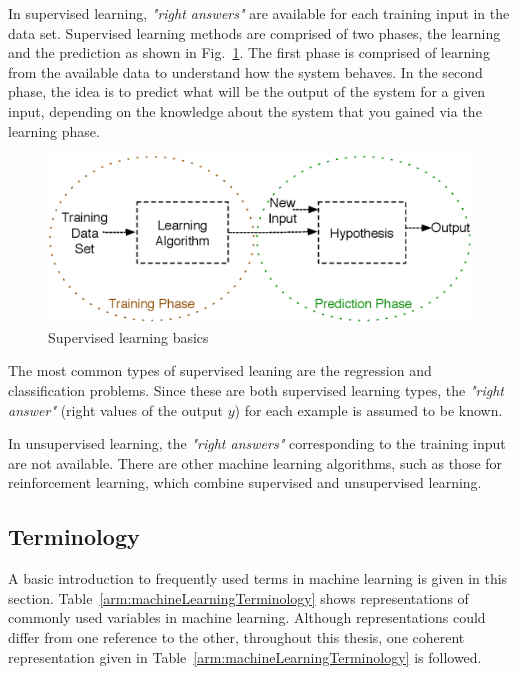 In supervised learning, \textit{"right answers"} are available for each training input in the data set.
Supervised learning methods are comprised of two phases, the learning and the prediction as shown in Fig.~\ref{fig:supervisedLearningBasics}.
The first phase is comprised of learning from the available data to understand how the system behaves. 
In the second phase, the idea is to predict what will be the output of the system for a given input, depending on the knowledge about the system that you gained via the learning phase. 

\begin{figure}
\begin{center}
\includegraphics[width=14cm]{figures/supervisedLearningBasics}    %
\caption{Supervised learning basics } 
\label{fig:supervisedLearningBasics}
\end{center}
\end{figure}
 
The most common types of supervised leaning are the regression and classification problems. 
Since these are both supervised learning types, the \textit{"right answer"} (right values of the output $y$) for each example is assumed to be known. 

In unsupervised learning, the \textit{"right answers"} corresponding to the training input are not available. 
There are other machine learning algorithms, such as those for reinforcement learning, which combine supervised and unsupervised learning. 

\subsection{Terminology}

A basic introduction to frequently used terms in machine learning is given in this section.  
Table~\ref{arm:machineLearningTerminology} shows representations of commonly used variables in machine learning. 
Although representations could differ from one reference to the other, throughout this thesis, one coherent representation given in Table~\ref{arm:machineLearningTerminology} is followed. 

